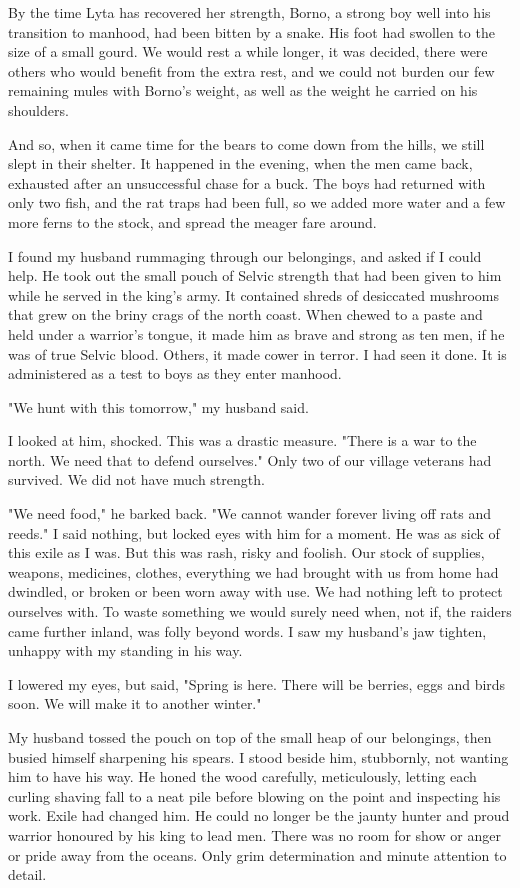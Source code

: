 By the time Lyta has recovered her strength, Borno, a strong boy well into his transition to manhood, had been bitten by a snake. His foot had swollen to the size of a small gourd. We would rest a while longer, it was decided, there were others who would benefit from the extra rest, and we could not burden our few remaining mules with Borno's weight, as well as the weight he carried on his shoulders.

And so, when it came time for the bears to come down from the hills, we still slept in their shelter. It happened in the evening, when the men came back, exhausted after an unsuccessful chase for a buck. The boys had returned with only two fish, and the rat traps had been full, so we added more water and a few more ferns to the stock, and spread the meager fare around.

I found my husband rummaging through our belongings, and asked if I could help. He took out the small pouch of Selvic strength that had been given to him while he served in the king's army. It contained shreds of desiccated mushrooms that grew on the briny crags of the north coast. When chewed to a paste and held under a warrior's tongue, it made him as brave and strong as ten men, if he was of true Selvic blood. Others, it made cower in terror. I had seen it done. It is administered as a test to boys as they enter manhood.

"We hunt with this tomorrow," my husband said.

I looked at him, shocked. This was a drastic measure. "There is a war to the north. We need that to defend ourselves." Only two of our village veterans had survived. We did not have much strength.

"We need food," he barked back. "We cannot wander forever living off rats and reeds." I said nothing, but locked eyes with him for a moment. He was as sick of this exile as I was. But this was rash, risky and foolish. Our stock of supplies, weapons, medicines, clothes, everything we had brought with us from home had dwindled, or broken or been worn away with use. We had nothing left to protect ourselves with. To waste something we would surely need when, not if, the raiders came further inland, was folly beyond words. I saw my husband's jaw tighten, unhappy with my standing in his way.

I lowered my eyes, but said, "Spring is here. There will be berries, eggs and birds soon. We will make it to another winter."

My husband tossed the pouch on top of the small heap of our belongings, then busied himself sharpening his spears. I stood beside him, stubbornly, not wanting him to have his way. He honed the wood carefully, meticulously, letting each curling shaving fall to a neat pile before blowing on the point and inspecting his work. Exile had changed him. He could no longer be the jaunty hunter and proud warrior honoured by his king to lead men. There was no room for show or anger or pride away from the oceans. Only grim determination and minute attention to detail.

